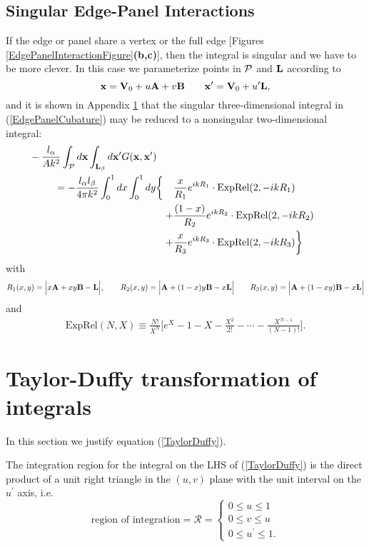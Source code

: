 \documentclass[letterpaper]{article}
\begin{document}
\subsection*{Singular Edge-Panel Interactions}

If the edge or panel share a vertex or the full 
edge [Figures \ref{EdgePanelInteractionFigure}\textbf{(b,c)}],
then the integral is singular and we have to be more clever.
In this case we parameterize points in $\mathcal{P}$ and $\mathbf{L}$ 
according to
$$ \mathbf{x} = \mathbf{V}_0 + u\mathbf{A} + v\mathbf{B}
   \qquad
   \mathbf{x}^\prime = \mathbf{V}_0 + u^\prime \mathbf{L},
$$
and it is shown in Appendix \ref{EdgePanelAppendix}
that the singular three-dimensional integral in (\ref{EdgePanelCubature})
may be reduced to a nonsingular two-dimensional integral:
\begin{align}
&\hspace{-2in}
 -\frac{l_\alpha}{Ak^2}
   \int_{\pan} d\vb x \int_{\vb L_\beta} d\vb x^\prime
   G(\vb x, \vb x^\prime)
\\
 =
 -\frac{l_\alpha l_\beta}{4\pi k^2}\int_0^1 dx \int_0^1 dy \bigg\{
 \quad &\frac{x}{R_1} e^{ikR_1} \cdot \text{ExpRel}(2,-ikR_1)
\\
      +&\frac{(1-x)}{R_2} e^{ikR_2} \cdot \text{ExpRel}(2,-ikR_2)
\\
      +&\frac{x}{R_3}e^{ikR_3} \cdot \text{ExpRel}(2,-ikR_3)
  \bigg\}
\end{align}
with
$$ R_1(x,y)=\Big| x\mathbf{A} + xy \mathbf{B} - \mathbf{L} \Big|,
   \qquad
   R_2(x,y)=\Big| \mathbf{A} + (1-x)y \mathbf{B} - x\mathbf{L}\Big|
   \qquad
   R_3(x,y)=\Big| \mathbf{A} + (1-xy) \mathbf{B} - x\mathbf{L}\Big|
$$
and
\begin{align*}
 \text{ExpRel}(N,X) \equiv
 \frac{N!}{X^N}\Big[e^{X} - 1 - X - \frac{X^2}{2!} - \cdots 
                             - \frac{X^{N-1}}{(N-1)!} \Big].
\end{align*}

\appendix
\newpage
\section{Taylor-Duffy transformation of integrals}
\label{EdgePanelAppendix}

In this section we justify equation 
(\ref{TaylorDuffy}).

The integration region for the integral on the LHS of 
(\ref{TaylorDuffy}) is the direct product of a unit
right triangle in the $(u,v)$ plane with the unit 
interval on the $u^\prime$ axis, i.e. 
$$\text{region of integration}=\mathcal{R}=
  \begin{cases}
  0\le u \le 1 \\
  0\le v \le u \\
  0\le u^\prime \le 1.
  \end{cases}
$$
\end{document}
